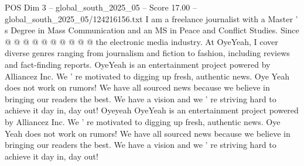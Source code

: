 \begin{textsample}{POS Dim 3 – global\_south\_2025\_05 – Score 17.00 – global\_south\_2025\_05/124216156.txt}
I am a freelance journalist with a Master ' s Degree in Mass Communication and an MS in Peace and Conflict Studies.
Since @ @ @ @ @ @ @ @ @ @ the electronic media industry.
At OyeYeah, I cover diverse genres ranging from journalism and fiction to fashion, including reviews and fact-finding reports.
OyeYeah is an entertainment project powered by Alliancez Inc.
We ' re motivated to digging up fresh, authentic news.
Oye Yeah does not work on rumors!
We have all sourced news because we believe in bringing our readers the best.
We have a vision and we ' re striving hard to achieve it day in, day out!
Oyeyeah OyeYeah is an entertainment project powered by Alliancez Inc.
We ' re motivated to digging up fresh, authentic news.
Oye Yeah does not work on rumors!
We have all sourced news because we believe in bringing our readers the best.
We have a vision and we ' re striving hard to achieve it day in, day out!

\end{textsample}
